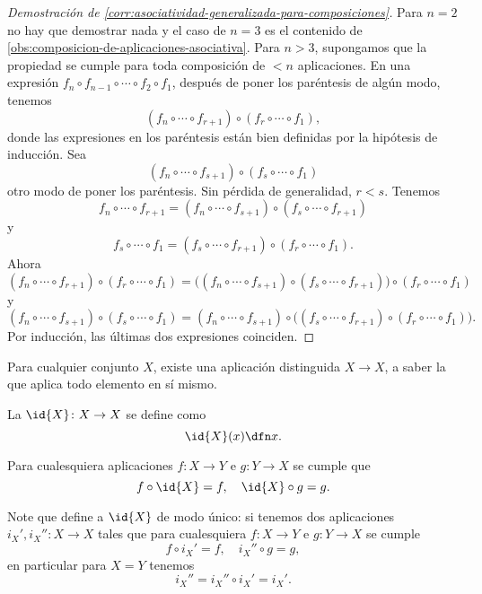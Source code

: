 \begin{proof}[Demostración de \ref{corr:asociatividad-generalizada-para-composiciones}]
  Para $n = 2$ no hay que demostrar nada y el caso de $n = 3$ es el contenido de
  \ref{obs:composicion-de-aplicaciones-asociativa}. Para $n > 3$, supongamos que
  la propiedad se cumple para toda composición de $< n$ aplicaciones. En una
  expresión $f_n\circ f_{n-1}\circ\cdots\circ f_2\circ f_1$, después de poner
  los paréntesis de algún modo, tenemos
  $$(f_n\circ\cdots\circ f_{r+1})\circ (f_r\circ\cdots\circ f_1),$$
  donde las expresiones en los paréntesis están bien definidas por la hipótesis
  de inducción. Sea
  $$(f_n\circ\cdots\circ f_{s+1})\circ (f_s\circ\cdots\circ f_1)$$
  otro modo de poner los paréntesis. Sin pérdida de generalidad,
  $r < s$. Tenemos
  $$f_n\circ\cdots\circ f_{r+1} = (f_n\circ\cdots\circ f_{s+1})\circ (f_s\circ\cdots\circ f_{r+1})$$
  y
  $$f_s\circ\cdots\circ f_1 = (f_s\circ\cdots\circ f_{r+1})\circ (f_r\circ\cdots\circ f_1).$$
  Ahora
  $$(f_n\circ\cdots\circ f_{r+1})\circ (f_r\circ\cdots\circ f_1) = \bigl((f_n\circ\cdots\circ f_{s+1})\circ (f_s\circ\cdots\circ f_{r+1})\bigr)\circ (f_r\circ\cdots\circ f_1)$$
  y
  $$(f_n\circ\cdots\circ f_{s+1})\circ (f_s\circ\cdots\circ f_1) = (f_n\circ\cdots\circ f_{s+1})\circ \bigl((f_s\circ\cdots\circ f_{r+1})\circ (f_r\circ\cdots\circ f_1)\bigr).$$
  Por inducción, las últimas dos expresiones coinciden.
\end{proof}

Para cualquier conjunto $X$, existe una aplicación distinguida $X\to X$, a saber
la que aplica todo elemento en sí mismo.

\begin{definicion}
  La 
  $\id{X}\colon X\to X$ se define como
  $$\id{X} (x) \dfn x.$$
\end{definicion}

\begin{observacion}
  \label{obs:f-circ-id--id-circ-f}
  Para cualesquiera aplicaciones $f\colon X\to Y$ e $g\colon Y\to X$ se cumple
  que
  \begin{equation}
    \label{eqn:f-circ-id--id-circ-f}
    f\circ \id{X} = f, \quad \id{X}\circ g = g.
  \end{equation}
\end{observacion}

Note que  define a $\id{X}$ de modo único:
si tenemos dos aplicaciones $i_X', i_X''\colon X\to X$ tales que para
cualesquiera $f\colon X\to Y$ e $g\colon Y\to X$ se cumple
$$f\circ i_X' = f, \quad i_X''\circ g = g,$$
en particular para $X=Y$ tenemos
$$i_X'' = i_X''\circ i_X' = i_X'.$$

